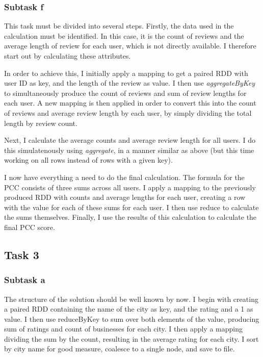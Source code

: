 \documentclass[a4paper]{article}
\begin{document}
\subsubsection{Subtask f}
This task must be divided into several steps. Firstly, the data used in the calculation must be identified. In this case, it is the count of reviews and the average length of review for each user, which is not directly available. I therefore start out by calculating these attributes.

In order to achieve this, I initially apply a mapping to get a paired RDD with user ID as key, and the length of the review as value. I then use \emph{aggregateByKey} to simultaneously produce the count of reviews and sum of review lengths for each user. A new mapping is then applied in order to convert this into the count of reviews and average review length by each user, by simply dividing the total length by review count.

Next, I calculate the average counts and average review length for all users. I do this simulatenously using \emph{aggregate}, in a manner similar as above (but this time working on all rows instead of rows with a given key).

I now have everything a need to do the final calculation. The formula for the PCC consists of three sums across all users. I apply a mapping to the previously produced RDD with counts and average lengths for each user, creating a row with the value for each of these sums for each user. I then use reduce to calculate the sums themselves. Finally, I use the results of this calculation to calculate the final PCC score.


\subsection{Task 3}

\subsubsection{Subtask a}
The structure of the solution should be well known by now. I begin with creating a paired RDD containing the name of the city as key, and the rating and a 1 as value. I then use reduceByKey to sum over both elements of the value, producing sum of ratings and count of businesses for each city. I then apply a mapping dividing the sum by the count, resulting in the average rating for each city. I sort by city name for good measure, coalesce to a single node, and save to file.
\end{document}
